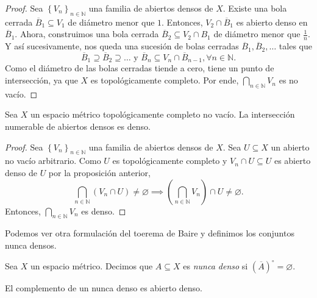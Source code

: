 \begin{proof}
	Sea $\left\{ V_n \right\}_{n \in \mathbb{N}}$ una familia de abiertos densos de $X$. Existe una bola cerrada $\overline{B}_1 \subseteq V_1$ de diámetro menor que $1$. Entonces, $V_2 \cap \overline{B}_1$ es abierto denso en $\overline{B}_1$. Ahora, construimos una bola cerrada $\overline{B}_2 \subseteq V_2 \cap B_1$ de diámetro menor que $\frac{1}{n}$. Y así sucesivamente, nos queda una sucesión de bolas cerradas $\overline{B}_1, \overline{B}_2, \ldots$ tales que
	\begin{equation*}
		\overline{B}_1 \supseteq \overline{B}_2 \supseteq \dots \text{ y } \overline{B}_n \subseteq V_n \cap \overline{B}_{n-1}, \forall n \in \mathbb{N}.
	\end{equation*}
	Como el diámetro de las bolas cerradas tiende a cero, tiene un punto de intersección, ya que $X$ es topológicamente completo. Por ende, $\bigcap_{n \in \mathbb{N}} V_n$ es no vacío.
\end{proof}

\begin{theorem}
	Sea $X$ un espacio métrico topológicamente completo no vacío. La intersección numerable de abiertos densos es denso.
\end{theorem}

\begin{proof}
	Sea $\left\{ V_n \right\}_{n \in \mathbb{N}}$ una familia de abiertos densos de $X$. Sea $U \subseteq X$ un abierto no vacío arbitrario. Como $U$ es topológicamente completo y $V_n \cap U \subseteq U$ es abierto denso de $U$ por la proposición anterior,
	\begin{equation*}
		\bigcap_{n \in \mathbb{N}} (V_n \cap U) \neq \varnothing \implies \left( \bigcap_{n \in \mathbb{N}} V_n  \right) \cap U \neq \varnothing.
	\end{equation*}
	Entonces, $\bigcap_{n \in \mathbb{N}} V_n$ es denso.
\end{proof}

Podemos ver otra formulación del toerema de Baire y definimos los conjuntos nunca densos.

\begin{definition}
	Sea $X$ un espacio métrico. Decimos que $A \subseteq X$ es \emph{nunca denso} si $(\overline{A})^{\circ} = \varnothing$.
\end{definition}

\begin{remark}
	El complemento de un nunca denso es abierto denso.
\end{remark}

